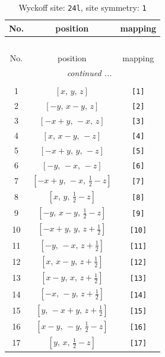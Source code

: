 \documentclass[fleqn,8pt]{jsarticle}
\begin{document}
\begin{longtable}{ccc}
\caption{Wyckoff site: {\tt 24l}, site symmetry: {\tt 1}}
 \\
 \hline \hline
No. & position & mapping \\ \hline \endfirsthead

\multicolumn{2}{l}{\tablename\ \thetable{}} \\
 \hline \hline
No. & position & mapping \\ \hline \endhead

 \hline \hline
\multicolumn{2}{r}{\footnotesize\it continued ...} \\ \endfoot

 \hline \hline
\multicolumn{2}{r}{} \\ \endlastfoot

1 & $\left[ x,\, y,\, z \right]$ & {\tt [1]} \\ \hline
2 & $\left[ - y,\, x - y,\, z \right]$ & {\tt [2]} \\ \hline
3 & $\left[ - x + y,\, - x,\, z \right]$ & {\tt [3]} \\ \hline
4 & $\left[ x,\, x - y,\, - z \right]$ & {\tt [4]} \\ \hline
5 & $\left[ - x + y,\, y,\, - z \right]$ & {\tt [5]} \\ \hline
6 & $\left[ - y,\, - x,\, - z \right]$ & {\tt [6]} \\ \hline
7 & $\left[ - x + y,\, - x,\, \frac{1}{2} - z \right]$ & {\tt [7]} \\ \hline
8 & $\left[ x,\, y,\, \frac{1}{2} - z \right]$ & {\tt [8]} \\ \hline
9 & $\left[ - y,\, x - y,\, \frac{1}{2} - z \right]$ & {\tt [9]} \\ \hline
10 & $\left[ - x + y,\, y,\, z + \frac{1}{2} \right]$ & {\tt [10]} \\ \hline
11 & $\left[ - y,\, - x,\, z + \frac{1}{2} \right]$ & {\tt [11]} \\ \hline
12 & $\left[ x,\, x - y,\, z + \frac{1}{2} \right]$ & {\tt [12]} \\ \hline
13 & $\left[ x - y,\, x,\, z + \frac{1}{2} \right]$ & {\tt [13]} \\ \hline
14 & $\left[ - x,\, - y,\, z + \frac{1}{2} \right]$ & {\tt [14]} \\ \hline
15 & $\left[ y,\, - x + y,\, z + \frac{1}{2} \right]$ & {\tt [15]} \\ \hline
16 & $\left[ x - y,\, - y,\, \frac{1}{2} - z \right]$ & {\tt [16]} \\ \hline
17 & $\left[ y,\, x,\, \frac{1}{2} - z \right]$ & {\tt [17]} \\ \hline

\end{longtable}
\end{document}
